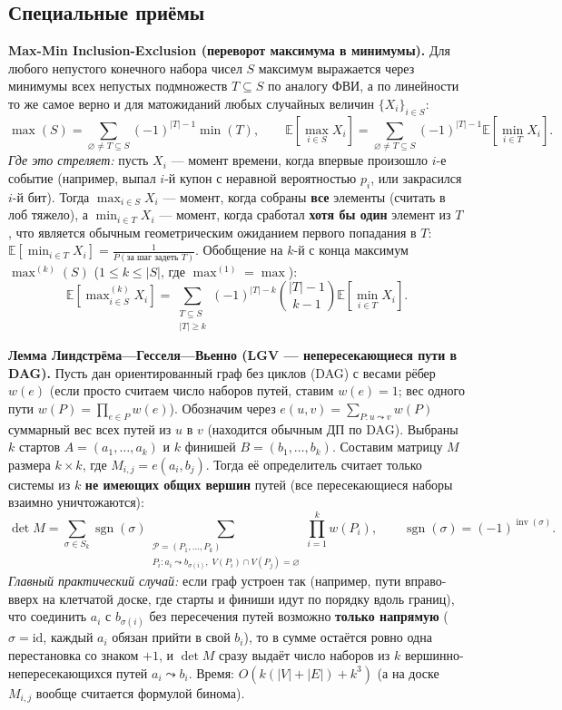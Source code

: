 \documentclass[10pt,a4paper]{article}
\renewcommand{\le}{\leqslant}
\renewcommand{\ge}{\geqslant}
\renewcommand{\emptyset}{\varnothing}
\newcommand{\E}{\mathbb{E}}
\DeclareMathOperator{\inv}{inv}
\DeclareMathOperator{\sgn}{sgn}
\begin{document}
\subsection{Специальные приёмы}

\textbf{Max-Min Inclusion-Exclusion (переворот максимума в минимумы).} Для любого непустого конечного набора чисел $S$ максимум выражается через минимумы всех непустых подмножеств $T \subseteq S$ по аналогу ФВИ, а по линейности то же самое верно и для матожиданий любых случайных величин $\{X_i\}_{i \in S}$:
\[
  \max(S) = \sum_{\emptyset \ne T \subseteq S} (-1)^{|T| - 1} \min(T), \qquad
  \E\!\left[\max_{i \in S} X_i\right] = \sum_{\emptyset \ne T \subseteq S} (-1)^{|T| - 1} \E\!\left[\min_{i \in T} X_i\right].
\]
\emph{Где это стреляет:} пусть $X_i$ — момент времени, когда впервые произошло $i$-е событие (например, выпал $i$-й купон с неравной вероятностью $p_i$, или закрасился $i$-й бит). Тогда $\max_{i \in S} X_i$ — момент, когда собраны \textbf{все} элементы (считать в лоб тяжело), а $\min_{i \in T} X_i$ — момент, когда сработал \textbf{хотя бы один} элемент из $T$, что является обычным геометрическим ожиданием первого попадания в $T$: $\E[\min_{i \in T} X_i] = \frac{1}{P(\text{за шаг задеть } T)}$.
Обобщение на $k$-й с конца максимум $\max^{(k)}(S)$ ($1 \le k \le |S|$, где $\max^{(1)} = \max$):
\[
  \E\!\left[\max\nolimits^{(k)}_{i \in S} X_i\right] = \sum_{\substack{T \subseteq S \\ |T| \ge k}} (-1)^{|T| - k} \binom{|T| - 1}{k - 1} \E\!\left[\min_{i \in T} X_i\right].
\]

\textbf{Лемма Линдстрёма—Гесселя—Вьенно (LGV — непересекающиеся пути в DAG).} Пусть дан ориентированный граф без циклов (DAG) с весами рёбер $w(e)$ (если просто считаем число наборов путей, ставим $w(e) = 1$; вес одного пути $w(P) = \prod_{e \in P} w(e)$). Обозначим через $e(u, v) = \sum_{P : u \leadsto v} w(P)$ суммарный вес всех путей из $u$ в $v$ (находится обычным ДП по DAG). Выбраны $k$ стартов $A = (a_1, \dots, a_k)$ и $k$ финишей $B = (b_1, \dots, b_k)$. Составим матрицу $M$ размера $k \times k$, где $M_{i,j} = e(a_i, b_j)$. Тогда её определитель считает только системы из $k$ \textbf{не имеющих общих вершин} путей (все пересекающиеся наборы взаимно уничтожаются):
\[
  \det M = \sum_{\sigma \in S_k} \sgn(\sigma) \sum_{\substack{\mathcal{P} = (P_1, \dots, P_k) \\ P_i : a_i \leadsto b_{\sigma(i)},\; V(P_i) \cap V(P_j) = \emptyset}} \prod_{i=1}^{k} w(P_i), \qquad \sgn(\sigma) = (-1)^{\inv(\sigma)}.
\]
\emph{Главный практический случай:} если граф устроен так (например, пути вправо-вверх на клетчатой доске, где старты и финиши идут по порядку вдоль границ), что соединить $a_i$ с $b_{\sigma(i)}$ без пересечения путей возможно \textbf{только напрямую} ($\sigma = \mathrm{id}$, каждый $a_i$ обязан прийти в свой $b_i$), то в сумме остаётся ровно одна перестановка со знаком $+1$, и $\det M$ сразу выдаёт число наборов из $k$ вершинно-непересекающихся путей $a_i \leadsto b_i$. Время: $O(k(|V| + |E|) + k^3)$ (а на доске $M_{i,j}$ вообще считается формулой бинома).
\end{document}
